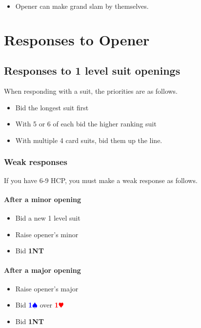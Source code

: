 \documentclass{article}
\newcommand{\Hs}{\textcolor{Red}{$\varheart$}}
\newcommand{\Ss}{\textcolor{Blue}{$\spadesuit$}}
\newcommand{\NTs}{\textbf{\footnotesize{NT}}}
\renewcommand{\H}[1]{\textcolor{Red}{\textbf{#1}\Hs}}
\renewcommand{\S}[1]{\textcolor{Blue}{\textbf{#1}\Ss}}
\newcommand{\NT}[1]{\textbf{#1\NTs}}
\begin{document}
\begin{itemize}
\item Opener can make grand slam by themselves.
\end{itemize}

\section{Responses to Opener}

\subsection{Responses to 1 level suit openings}

When responding with a suit, the priorities are as follows.
\begin{itemize}
\item Bid the longest suit first
\item With 5 or 6 of each bid the higher ranking suit
\item With multiple 4 card suits, bid them up the line.
\end{itemize}

\subsubsection{Weak responses}

If you have 6-9 HCP, you must make a weak response as follows.

\paragraph{After a minor opening}

\begin{itemize}
\item Bid a new 1 level suit
\item Raise opener's minor
\item Bid \NT{1}
\end{itemize}

\paragraph{After a major opening}

\begin{itemize}
\item Raise opener's major
\item Bid \S{1} over \H{1}
\item Bid \NT{1}
\end{itemize}
\end{document}
